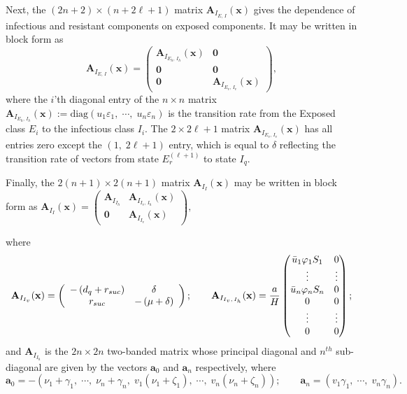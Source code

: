 \documentclass[a4paper]{article}
\newcommand{\varpiVar}{r_{suc}}
\newcommand{\hatmuVar}{d_q}
\begin{document}
Next, the $(2n+2)\times (n+2\ell+1)$ matrix  $ \mathbf A_{I_{E,\,I}}(\mathbf x)$  gives the dependence of infectious and resistant components on exposed components.  It  may be written in block  form as
\[
\mathbf A_{I_{E,\,I}}(\mathbf x) =    \begin{pmatrix} \mathbf  A_{I_{{E_h},\,{I_h}}}(\mathbf x) &   \mathbf 0 \\ \mathbf 0  &  \mathbf 0 \\ \mathbf 0 & \mathbf
 A_{I_{{E_v},\,{I_v}}}(\mathbf x) \end{pmatrix},
\label{eq:matie}
\]
where the $i$'th diagonal entry of the $n\times n$ matrix $\mathbf  A_{I_{{E_h},\,{I_h}}}(\mathbf x):= \mathrm{diag}(u_1\varepsilon_1,\;\cdots,\;u_n\varepsilon_n)$ is the transition rate from the Exposed class $E_i$ to the infectious class $I_i$. The $2\times 2\ell+1$ matrix $\mathbf
A_{I_{{E_v},\,{I_v}}}(\mathbf x)$ has all entries zero except the $(1,\; 2\ell+1)$ entry, which is equal to $\delta$ reflecting the transition rate of vectors from state $E^{(\ell+1)}_r$ to state $I_q$.
 
Finally, the $2(n+1)\times 2(n+1)$  matrix
$ \mathbf A_{I_I}(\mathbf x)$ may be written in block  form as $
\mathbf A_{I_I}(\mathbf x) =    \left(\begin{array}{cc} \mathbf A_{I_{I_h}}
&   \mathbf
A_{I_{{I_v},\,{I_h}}}(\mathbf x) \\ \mathbf 0 &  \mathbf
A_{I_{I_v}}(\mathbf x) \end{array}\right),
$
 
  where 
\begin{align*}
\mathbf A_{I_{I_v}}(\mathbf x) = \left(\begin{array}{cc}-\left(\hatmuVar +\varpiVar \right) &
\delta\\\varpiVar  & - \left( \mu+\delta\right)\end{array}\right); \qquad 
\mathbf A_{I_{{I_v},\,{I_h}}}(\mathbf x) = \dfrac{a}{H}\begin{pmatrix}
\bar u_1\varphi_1 S_1&0\cr\vdots&\vdots\cr\bar u_n\varphi_n S_n&0\cr0&0\cr\vdots&\vdots\cr0&0
\end{pmatrix};
\end{align*}
and
$\mathbf A_{I_{I_h}}$ is the $2n \times 2n$ two-banded matrix whose principal diagonal and $n^{th}$ sub-diagonal are given by the vectors $\mathbf a_0 $ and $\mathbf a_n$ respectively, where  
\begin{equation*}
\mathbf a_0 = -\left(
\nu_1+\gamma_1,\;\cdots,\;\nu_n+\gamma_n,\;v_1(\nu_1+\zeta_1),\;\cdots,\;v_n(\nu_n+\zeta_n)\right); \qquad\mathbf a_n = \left(v_1\gamma_1,\; \cdots,\; v_n\gamma_n\right).
\end{equation*}
\end{document}
